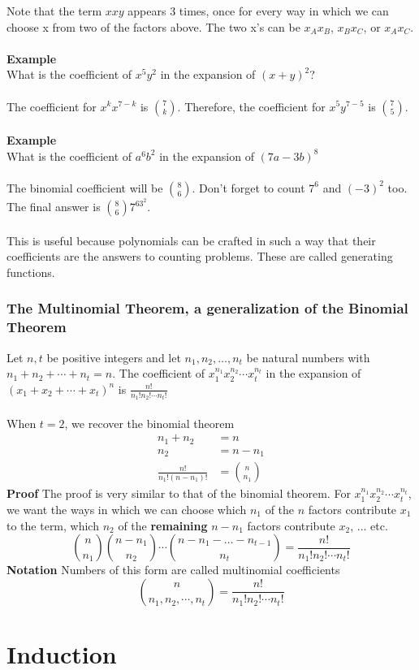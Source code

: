 \documentclass[12pt]{article}
\begin{document}
	Note that the term $xxy$ appears 3 times, once for every way in which we can choose x from two of the factors above. The two x's can be $x_Ax_B$, $x_Bx_C$, or $x_Ax_C$. \\\\
	\textbf{Example}\\
	What is the coefficient of $x^5y^2$ in the expansion of $(x + y)^2$?\\\\
	The coefficient for $x^kx^{7-k}$ is ${7 \choose k}$. Therefore, the coefficient for $x^{5}y^{7-5}$ is ${7 \choose 5}$.\\\\
	\textbf{Example}\\
	What is the coefficient of $a^6b^2$ in the expansion of $(7a-3b)^8$\\\\
	The binomial coefficient will be ${8 \choose 6}$. Don't forget to count $7^6$ and $(-3)^2$ too. The final answer is ${8 \choose 6}7^63^2$. \\\\
	This is useful because polynomials can be crafted in such a way that their coefficients are the answers to counting problems. These are called generating functions.

	\subsubsection{The Multinomial Theorem, a generalization of the Binomial Theorem}
	Let $n, t$ be positive integers and let $n_1, n_2, \ldots, n_t$ be natural numbers with $n_1 + n_2 + \cdots + n_t = n$. The coefficient of $x_1^{n_1}x_2^{n_2} \cdots x_t^{n_t}$ in the expansion of $(x_1 + x_2 + \cdots + x_t)^n$ is $\frac{n!}{n_1!n_2!\cdots n_t!}$ \\\\
	When $t = 2$, we recover the binomial theorem
	\begin{align*}
		n_1 + n_2 &= n \\
		n_2 &= n - n_1 \\
		\frac{n!}{n_1!(n - n_1)!} &= {n \choose n_1}
	\end{align*} 
	\textbf{Proof} 
	The proof is very similar to that of the binomial theorem. For $x_1^{n_1}x_2^{n_2} \cdots x_t^{n_t}$, we want the ways in which we can choose which $n_1$ of the $n$ factors contribute $x_1$ to the term, which $n_2$ of the \textbf{remaining} $n - n_1$ factors contribute $x_2$, ... etc.
	$${n \choose n_1}{n - n_1 \choose n_2}\cdots {n - n_1 - \ldots - n_{t-1} \choose n_t} = \frac{n!}{n_1!n_2!\cdots n_t!}$$
	\textbf{Notation}
	Numbers of this form are called multinomial coefficients
	$${n \choose n_1, n_2, \cdots, n_t} = \frac{n!}{n_1!n_2!\cdots n_t!}$$
	\section{Induction}
\end{document}
